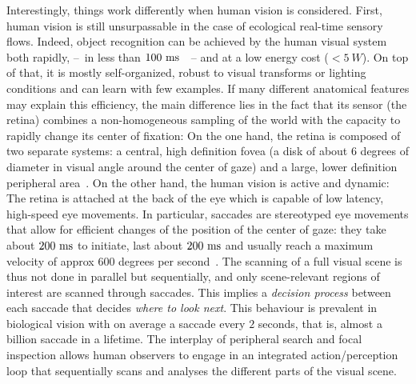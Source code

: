 Interestingly, things work differently when human vision is considered. First, human vision is still unsurpassable in the case of ecological real-time sensory flows. Indeed, object recognition can be achieved by the human visual system both rapidly, --~in less than $100~\si{\milli\second}$~\cite{Kirchner06}~-- and at a low energy cost ($<5~W$). On top of that, it is mostly self-organized, robust to visual transforms or lighting conditions and can learn with few examples. If many different anatomical features may explain this efficiency, the main difference lies in the fact that its sensor (the retina) combines a non-homogeneous sampling of the world with the capacity to rapidly change its center of fixation: On the one hand, the retina is composed of two separate systems: a central, high definition fovea (a disk of about $6$ degrees of diameter in visual angle around the center of gaze) and a large, lower definition peripheral area~\cite{Strasburger11}. On the other hand, the human vision is active and dynamic: The retina is attached at the back of the eye which is capable of low latency, high-speed eye movements. In particular, saccades are stereotyped eye movements that allow for efficient changes of the position of the center of gaze: they take about $200~\si{\milli\second}$ to initiate, last about $200~\si{\milli\second}$ and usually reach a maximum velocity of approx $600$ degrees per second~\cite{Bahill75}. The scanning of a full visual scene is thus not done in parallel but sequentially, and only scene-relevant regions of interest are scanned through saccades. This implies a \emph{decision process} between each saccade that decides \emph{where to look next}. This behaviour is prevalent in biological vision with on average a saccade every $2$ seconds, that is, almost a billion saccade in a lifetime. The interplay of peripheral search and focal inspection allows human observers to engage in an integrated action/perception loop that sequentially scans and analyses the different parts of the visual scene.

